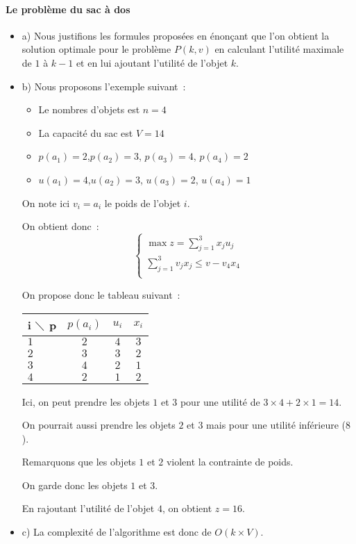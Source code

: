 \paragraph{Le problème du sac à dos}
\begin{itemize}
\item a) Nous justifions les formules proposées en énonçant que l'on
  obtient la solution optimale pour le problème $P(k,v)$ en calculant
  l'utilité maximale de $1$ à $k-1$ et en lui ajoutant l'utilité de
  l'objet $k$.
\item b) Nous proposons l'exemple suivant~:
\begin{itemize}
\item Le nombres d'objets est $n = 4$
\item La capacité du sac est $V = 14$
\item $p(a_1)=2$,$p(a_2)=3$, $p(a_3)=4$, $p(a_4)=2$
\item $u(a_1)=4$,$u(a_2)=3$, $u(a_3)=2$, $u(a_4)=1$
\end{itemize}
On note ici $v_i=a_i$ le poids de l'objet $i$.

On obtient donc~:
\begin{equation}
\begin{cases}
\max z = \sum_{j=1}^3 x_ju_j \\
\sum_{j=1}^3v_jx_j \leq v - v_4x_4 \\
\end{cases}
\end{equation}

On propose donc le tableau suivant~:
\begin{center}
\begin{tabular}{|l|c|c|c|}
\hline  i $\diagdown$ p  & $p(a_i)$ & $u_i$ & $x_i$  \\
\hline $1$ & $2$ & $4$ & $3$ \\
\hline $2$ & $3$ & $3$ & $2$  \\
\hline $3$ & $4$ & $2$ & $1$ \\
\hline $4$ & $2$ & $1$ & $2$ \\
\hline
\end{tabular}
\end{center}
\vspace{1cm}
Ici, on peut prendre les objets $1$ et $3$ pour une utilité de
$3 \times 4 + 2 \times 1 = 14$.


On pourrait aussi prendre les objets $2$ et $3$ mais pour une utilité
inférieure ($8$).

Remarquons que les objets $1$ et $2$ violent la contrainte de poids.


On garde donc les objets $1$ et $3$.

En rajoutant l'utilité de l'objet $4$, on obtient $z=16$.

\item c) La complexité de l'algorithme est donc de $O(k \times V)$.
\end{itemize}

